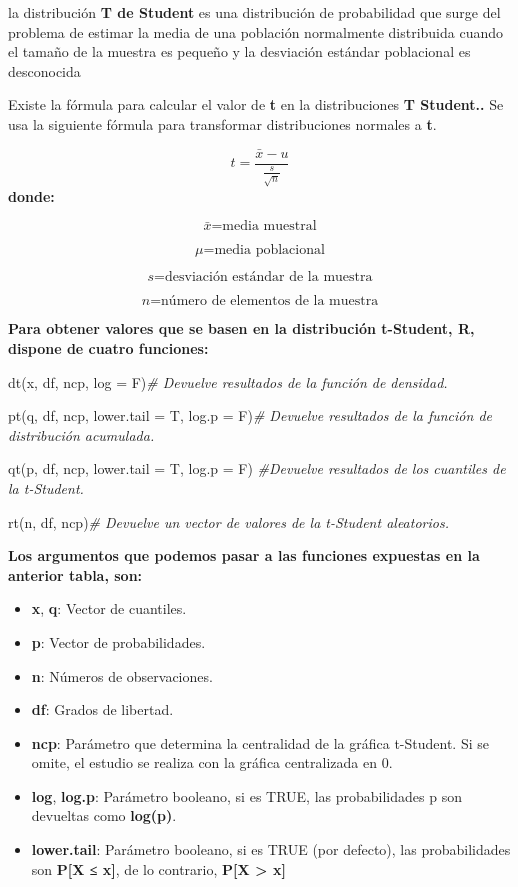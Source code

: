 \documentclass[
]{article}
\newenvironment{Shaded}{\begin{snugshade}}{\end{snugshade}}
\newcommand{\AttributeTok}[1]{\textcolor[rgb]{0.77,0.63,0.00}{#1}}
\newcommand{\CommentTok}[1]{\textcolor[rgb]{0.56,0.35,0.01}{\textit{#1}}}
\newcommand{\FunctionTok}[1]{\textcolor[rgb]{0.00,0.00,0.00}{#1}}
\newcommand{\NormalTok}[1]{#1}
\begin{document}
la distribución \textbf{T de Student} es una distribución de
probabilidad que surge del problema de estimar la media de una población
normalmente distribuida cuando el tamaño de la muestra es pequeño y la
desviación estándar poblacional es desconocida

Existe la fórmula para calcular el valor de \textbf{t} en la
distribuciones \textbf{T Student..} Se usa la siguiente fórmula para
transformar distribuciones normales a \textbf{t}.

\[t=\frac{\bar{x}-u}{\frac{s}{\sqrt{n}}}\] \textbf{donde:}

\[\bar{x}\text{=media muestral}\]

\[μ \text{=media poblacional}\]

\[s\text{=desviación estándar de la muestra}\]

\[n\text{=número de elementos de la muestra}\]

\textbf{Para obtener valores que se basen en la distribución t-Student,
R, dispone de cuatro funciones:}

\begin{Shaded}
\begin{Highlighting}[]
\FunctionTok{dt}\NormalTok{(x, df, ncp, }\AttributeTok{log =}\NormalTok{ F)}\CommentTok{\#    Devuelve resultados de la función de densidad.}

\FunctionTok{pt}\NormalTok{(q, df, ncp, }\AttributeTok{lower.tail =}\NormalTok{ T, }\AttributeTok{log.p =}\NormalTok{ F)}\CommentTok{\#  Devuelve resultados de la función de distribución acumulada.}

\FunctionTok{qt}\NormalTok{(p, df, ncp, }\AttributeTok{lower.tail =}\NormalTok{ T, }\AttributeTok{log.p =}\NormalTok{ F)   }\CommentTok{\#Devuelve resultados de los cuantiles de la t{-}Student.}

\FunctionTok{rt}\NormalTok{(n, df, ncp)}\CommentTok{\# Devuelve un vector de valores de la t{-}Student aleatorios.}
\end{Highlighting}
\end{Shaded}

\textbf{Los argumentos que podemos pasar a las funciones expuestas en la
anterior tabla, son:}

\begin{itemize}
\item
  \textbf{x}, \textbf{q}: Vector de cuantiles.
\item
  \textbf{p}: Vector de probabilidades.
\item
  \textbf{n}: Números de observaciones.
\item
  \textbf{df}: Grados de libertad.
\item
  \textbf{ncp}: Parámetro que determina la centralidad de la gráfica
  t-Student. Si se omite, el estudio se realiza con la gráfica
  centralizada en 0.
\item
  \textbf{log}, \textbf{log.p}: Parámetro booleano, si es TRUE, las
  probabilidades p son devueltas como \textbf{log(p)}.
\item
  \textbf{lower.tail}: Parámetro booleano, si es TRUE (por defecto), las
  probabilidades son \textbf{P{[}X ≤ x{]}}, de lo contrario,
  \textbf{P{[}X \textgreater{} x{]}}
\end{itemize}
\end{document}
